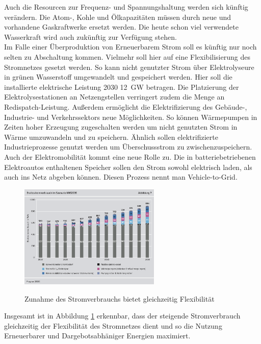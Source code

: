 		Auch die Resourcen zur Frequenz- und Spannungshaltung werden sich künftig verändern. Die Atom-, Kohle und Ölkapazitäten müssen durch neue und vorhandene Gaskraftwerke ersetzt werden. Die heute schon viel verwendete Wasserkraft wird auch zukünftig zur Verfügung stehen.\\
		Im Falle einer Überproduktion von Erneuerbarem Strom soll es künftig nur noch selten zu Abschaltung kommen. Vielmehr soll hier auf eine Flexibilisierung des Stromnetzes gesetzt werden. So kann nicht genutzter Strom über Elektrolyseure in grünen Wasserstoff umgewandelt und gespeichert werden. Hier soll die installierte elektrische Leistung 2030 \SI{12}{\giga \watt } betragen. \cite[S.11]{Agora_KlimaneutralesStromsystem} Die Platzierung der Elektrolysestationen an Netzengstellen verringert zudem die Menge an Redispatch-Leistung. Außerdem ermöglicht die Elektrifizierung des Gebäude-, Industrie- und Verkehrssektors neue Möglichkeiten. So können Wärmepumpen in Zeiten hoher Erzeugung zugeschalten werden um nicht genutzten Strom in Wärme umzuwandeln und zu speichern. Ähnlich sollen elektrifizierte Industrieprozesse genutzt werden um Überschussstrom zu zwischenzuspeichern.\\
		Auch der Elektromobilität kommt eine neue Rolle zu. Die in batteriebetriebenen Elektroautos enthaltenen Speicher sollen den Strom sowohl elektrisch laden, als auch ins Netz abgeben können. Diesen Prozess nennt man Vehicle-to-Grid.\\
			
			\begin{figure}[H]
				\centering
				\includegraphics[page=1, clip, width=0.6\textwidth]{./anhang/Zunahme Stromverbrauch Agora2035.png}
				\caption{Zunahme des Stromverbrauchs bietet gleichzeitig Flexibilität}
				\label{Abb. Zunahme Flexibilität} \cite[S.33]{Agora_KlimaneutralesStromsystem}
			\end{figure}
		
		Insgesamt ist in Abbildung \ref{Abb. Zunahme Flexibilität} erkennbar, dass der steigende Stromverbrauch gleichzeitig der Flexibilität des Stromnetzes dient und so die Nutzung Erneuerbarer und Dargebotsabhäniger Energien maximiert.\\
		
